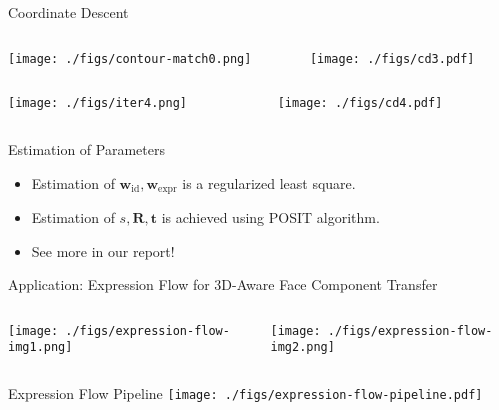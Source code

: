 \documentclass{beamer}
\begin{document}
\begin{frame}[allowframebreaks]{Coordinate Descent}
\begin{columns}
\begin{column}{0.45\textwidth}\texttt{[image: ./figs/contour-match0.png]}\end{column}
\begin{column}{0.7\textwidth}\texttt{[image: ./figs/cd3.pdf]}\end{column}
\end{columns}
\begin{columns}
\begin{column}{0.45\textwidth}\texttt{[image: ./figs/iter4.png]}\end{column}
\begin{column}{0.7\textwidth}\texttt{[image: ./figs/cd4.pdf]}\end{column}
\end{columns}
\end{frame}

\begin{frame}{Estimation of Parameters}
\begin{itemize}
\item Estimation of $\mathbf{w}_{\text{id}}, \mathbf{w}_{\text{expr}}$ is a regularized least square.
\item Estimation of $s, \mathbf{R}, \mathbf{t}$ is achieved using POSIT algorithm.
\item See more in our report!
\end{itemize}
\end{frame}

\begin{frame}{Application: Expression Flow for 3D-Aware Face Component Transfer\cite{yang2011expression}}
    
\begin{columns}
\begin{column}{0.5\textwidth}\texttt{[image: ./figs/expression-flow-img1.png]}\end{column}
\begin{column}{0.5\textwidth}\texttt{[image: ./figs/expression-flow-img2.png]}\end{column}
\end{columns}
\end{frame}
\begin{frame}{Expression Flow Pipeline}
\texttt{[image: ./figs/expression-flow-pipeline.pdf]}
\end{frame}
\end{document}
